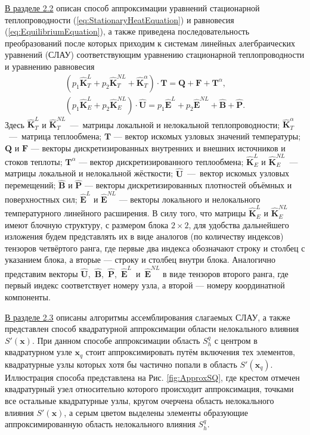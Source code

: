 \underline{В разделе 2.2} описан способ аппроксимации уравнений стационарной теплопроводности (\ref{eq:StationaryHeatEquation}) и равновесия (\ref{eq:EquilibriumEquation}), а также приведена последовательность преобразований после которых приходим к системам линейных алегбраических уравнений (СЛАУ) соответствующим уравнению стационарной теплопроводности и уравнению равновесия
\begin{gather}
	\label{eq:ThermalSLAE}
	\left( p_1 \widehat{\textbf{K}}^L_T + p_2 \widehat{\textbf{K}}^{NL}_T + \widehat{\textbf{K}}^{\alpha}_T \right) \cdot \textbf{T} = \textbf{Q} + \textbf{F} + \textbf{T}^{\alpha},
\\
	\label{eq:StressSLAE}
	\left( p_1 \widehat{\textbf{K}}^L_E + p_2 \widehat{\textbf{K}}^{NL}_E \right) \cdot \widehat{\textbf{U}} = p_1 \widehat{\textbf{E}}^L + p_2 \widehat{\textbf{E}}^{NL} + \widehat{\textbf{B}} + \widehat{\textbf{P}}.
\end{gather}
Здесь $\widehat{\textbf{K}}^L_T$ и $\widehat{\textbf{K}}^{NL}_T$~---~матрицы локальной и нелокальной теплопроводности;
$\widehat{\textbf{K}}^{\alpha}_T$~---~матрица теплообмена;
$\textbf{T}$ --- вектор искомых узловых значений температуры;
$\textbf{Q}$ и $\textbf{F}$ --- векторы дискретизированных внутренних и внешних источников и стоков теплоты;
$\textbf{T}^{\alpha}$ --- вектор дискретизированного теплообмена;
$\widehat{\textbf{K}}^L_E$ и $\widehat{\textbf{K}}^{NL}_E$~--- матрицы локальной и нелокальной жёсткости;
$\widehat{\textbf{U}}$~---~вектор искомых узловых перемещений;
$\widehat{\textbf{B}}$ и $\widehat{\textbf{P}}$ --- векторы дискретизированных плотностей объёмных и поверхностных сил;
$\widehat{\textbf{E}}^L$ и $\widehat{\textbf{E}}^{NL}$ --- векторы локального и нелокального температурного линейного расширения.
В силу того, что матрицы $\widehat{\textbf{K}}^L_E$ и $\widehat{\textbf{K}}^{NL}_E$ имеют блочную структуру, с размером блока $2 \times 2$, для удобства дальнейшего изложения будем представлять их в виде аналогов (по количеству индексов) тензоров четвёртого ранга, где первые два индекса обозначают строку и столбец с указанием блока, а вторые --- строку и столбец внутри блока.
Аналогично представим векторы \mbox{$\widehat{\textbf{U}}$, $\widehat{\textbf{B}}$, $\widehat{\textbf{P}}$, $\widehat{\textbf{E}}^L$ и $\widehat{\textbf{E}}^{NL}$} в виде тензоров второго ранга, где первый индекс соответствует номеру узла, а второй --- номеру координатной компоненты.

\underline{В разделе 2.3} описаны алгоритмы ассемблирования слагаемых СЛАУ, а также представлен способ квадратурной аппроксимации области нелокального влияния $S'(\boldsymbol{x})$. При данном способе аппроксимации область $S_h^q$ с центром в квадратурном узле $\boldsymbol{x}_q$ стоит аппроксимировать путём включения тех элементов, квадратурные узлы которых хотя бы частично попали в область $S'(\boldsymbol{x}_q)$. Иллюстрация способа представлена на Рис. \ref{fig:ApproxSQ}, где крестом отмечен квадратурный узел относительно которого происходит аппроксимация, точками все остальные квадратурные узлы, кругом очерчена область нелокального влияния $S'(\boldsymbol{x})$, а серым цветом выделены элементы образующие аппроксимированную область нелокального влияния $S_h^q$.

